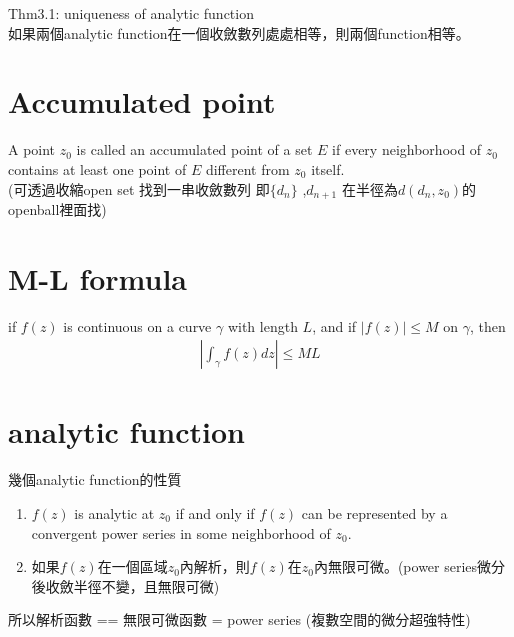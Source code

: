 \documentclass{article}
\begin{document}
Thm3.1: uniqueness of analytic function\\
如果兩個analytic function在一個收斂數列處處相等，則兩個function相等。\\


\section{Accumulated point}
A point $z_0$ is called an accumulated point of a set $E$ if every neighborhood of $z_0$ contains at least one point of $E$ different from $z_0$ itself.\\
(可透過收縮open set 找到一串收斂數列 即$\{d_n\}$ ,$d_{n+1}$ 在半徑為$d(d_{n},z_0)$的openball裡面找)

\section{M-L formula}
if $f(z)$ is continuous on a curve $\gamma$ with length $L$, and if $|f(z)| \leq M$ on $\gamma$, then
\begin{align*}
    |\int_{\gamma} f(z) dz| \leq ML
\end{align*}

\section{analytic function}
幾個analytic function的性質
\begin{enumerate}
    \item $f(z)$ is analytic at $z_0$ if and only if $f(z)$ can be represented by a convergent power series in some neighborhood of $z_0$.
    \item 如果$f(z)$在一個區域$z_0$內解析，則$f(z)$在$z_0$內無限可微。(power series微分後收斂半徑不變，且無限可微)
\end{enumerate}
所以解析函數 == 無限可微函數 = power series (複數空間的微分超強特性)
\end{document}
